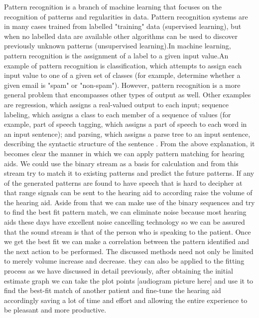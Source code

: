 \documentclass[sigconf]{acmart}
\begin{document}
 
Pattern recognition is a branch of machine learning that focuses on the recognition of patterns and regularities in data. Pattern recognition systems are in many cases trained from labelled "training" data (supervised learning), but when no labelled data are available other algorithms can be used to discover previously unknown patterns (unsupervised learning).In machine learning, pattern recognition is the assignment of a label to a given input value.An example of pattern recognition is classification, which attempts to assign each input value to one of a given set of classes (for example, determine whether a given email is "spam" or "non-spam"). However, pattern recognition is a more general problem that encompasses other types of output as well. Other examples are regression, which assigns a real-valued output to each input; sequence labeling, which assigns a class to each member of a sequence of values (for example, part of speech tagging, which assigns a part of speech to each word in an input sentence); and parsing, which assigns a parse tree to an input sentence, describing the syntactic structure of the sentence \cite{2017b}.
\newline
From the above explanation, it becomes clear the manner in which we can apply pattern matching for hearing aids. We could use the binary stream as a basis for calculation and from this stream try to match it to existing patterns and predict the future patterns. If any of the generated patterns are found to have speech that is hard to decipher at that range signals can be sent to the hearing aid to according raise the volume of the hearing aid. Aside from that we can make use of the binary sequences and try to find the best fit pattern match, we can eliminate noise because most hearing aids these days have excellent noise cancelling technology so we can be assured that the sound stream is that of the person who is speaking to the patient. Once we get the best fit we can make a correlation between the pattern identified and the next action to be performed. 
\newline
The discussed methods need not only be limited to merely volume increase and decrease. they can also be applied to the fitting process as we have discussed in detail previously, after obtaining the initial estimate graph we can take the plot points [audiogram picture here] and use it to find the best-fit match of another patient  and fine-tune the hearing aid accordingly saving a lot of time and effort and allowing the entire experience to be pleasant and more productive.
\newline
\end{document}
